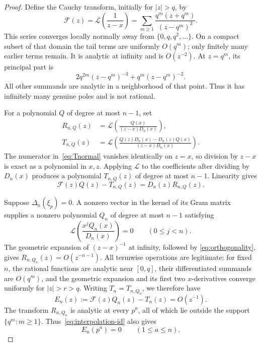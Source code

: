 \documentclass[11pt,letterpaper]{article}
\numberwithin{equation}{section}
\theoremstyle{remark}
\newcommand{\Lcal}{\mathcal L}
\begin{document}
\begin{proof}
Define the Cauchy transform, initially for $|z|>q$, by
\begin{equation}\label{eq:cauchy}
 \mathcal F(z)=\Lcal\left(\frac1{z-x}\right)
   =\sum_{m\ge1}\frac{q^m(z+q^m)}{(z-q^m)^3}.
\end{equation}
This series converges locally normally away from $\{0,q,q^2,\ldots\}$. On a compact subset of that domain the tail terms are uniformly $O(q^m)$; only finitely many earlier terms remain. It is analytic at infinity and is $O(z^{-2})$. At $z=q^m$, its principal part is
\begin{equation*}
 2q^{2m}(z-q^m)^{-3}+q^m(z-q^m)^{-2}.
\end{equation*}
All other summands are analytic in a neighborhood of that point. Thus it has infinitely many genuine poles and is not rational.

For a polynomial $Q$ of degree at most $n-1$, set
\begin{align}
 R_{n,Q}(z)&=\Lcal\left(\frac{Q(x)}{(z-x)D_n(x)}\right),
 \label{eq:Rnormal}\\
 T_{n,Q}(z)&=\Lcal\left(
 \frac{Q(z)D_n(x)-D_n(z)Q(x)}{(z-x)D_n(x)}\right).
 \label{eq:Tnormal}
\end{align}
The numerator in~\eqref{eq:Tnormal} vanishes identically on $z=x$, so division by $z-x$ is exact as a polynomial in $x,z$. Applying $\Lcal$ to the coefficients after dividing by $D_n(x)$ produces a polynomial $T_{n,Q}(z)$ of degree at most $n-1$. Linearity gives
\begin{equation}\label{eq:interpolation-id}
 \mathcal F(z)Q(z)-T_{n,Q}(z)=D_n(z)R_{n,Q}(z).
\end{equation}

Suppose $\Delta_n(\xi_p)=0$. A nonzero vector in the kernel of its Gram matrix supplies a nonzero polynomial $Q_n$ of degree at most $n-1$ satisfying
\begin{equation}\label{eq:orthogonality}
 \Lcal\left(\frac{x^jQ_n(x)}{D_n(x)}\right)=0
       \qquad(0\le j<n).
\end{equation}
The geometric expansion of $(z-x)^{-1}$ at infinity, followed by
\eqref{eq:orthogonality}, gives $R_{n,Q_n}(z)=O(z^{-n-1})$.
All termwise operations are legitimate: for fixed $n$, the rational functions are analytic near $[0,q]$, their differentiated summands are $O(q^m)$, and the geometric expansion and its first two $x$-derivatives converge uniformly for $|z|>r>q$. Writing $T_n=T_{n,Q_n}$, we therefore have
\begin{equation}\label{eq:errornormal}
 E_n(z):=\mathcal F(z)Q_n(z)-T_n(z)=O(z^{-1}).
\end{equation}
The transform $R_{n,Q_n}$ is analytic at every $p^a$, all of which lie outside the support $\{q^m:m\ge1\}$. Thus~\eqref{eq:interpolation-id} also gives
\begin{equation}\label{eq:exterior-zeros}
 E_n(p^a)=0\qquad(1\le a\le n).
\end{equation}


\end{proof}
\end{document}
